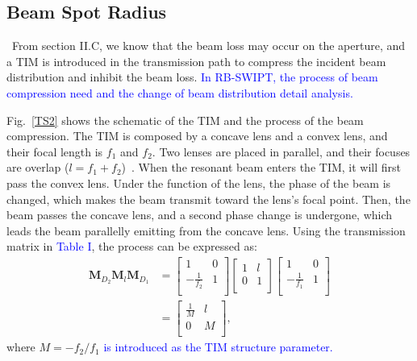 \documentclass{IEEEtran}
\begin{document}
\subsection{Beam Spot Radius}\
From section II.C, we know that the beam loss may occur on the aperture, and a TIM is introduced in the transmission path to compress the incident beam distribution and inhibit the beam loss. 
\textcolor{blue}{In RB-SWIPT, the process of beam compression need and the change of beam distribution detail analysis. }

Fig.~\ref{TS2} shows the schematic of the TIM and the process of the beam compression. The TIM is composed by a concave lens and a convex lens, and their focal length is $f_1$ and $f_2$. Two lenses are placed in parallel, and their focuses are overlap ($l=f_1+f_2$)~\cite{born2013principles}. 
When the resonant beam enters the TIM, it will first pass the convex lens. Under the function of the lens, the phase of the beam is changed, which makes the beam transmit toward the lens's focal point. Then, the beam passes the concave lens, and a second phase change is undergone, which leads the beam parallelly emitting from the concave lens. Using the transmission matrix in \textcolor{blue}{Table I}, the process can be expressed as:
\begin{equation}\label{TIMmatrix1}
\begin{aligned}
\mathbf{M}_{D_2}\mathbf{M}_l\mathbf{M}_{D_1}
&=\left[ \begin{array}{cc}
1 & 0 \\
-\frac{1}{f_2} & 1 \\\end{array} \right ]\left[ \begin{array}{cc}
1 & l \\
0 & 1 \\\end{array} \right ]
\left[ \begin{array}{cc}
1 & 0 \\
-\frac{1}{f_1} & 1 \\\end{array} \right ]\\
&=\left[ \begin{array}{cc}
\frac{1}{M} & l \\
0 & M \\\end{array} \right ],
\end{aligned}
\end{equation}
where $M=-f_2/f_1$ \textcolor{blue}{is introduced as the TIM structure parameter. }
\end{document}
